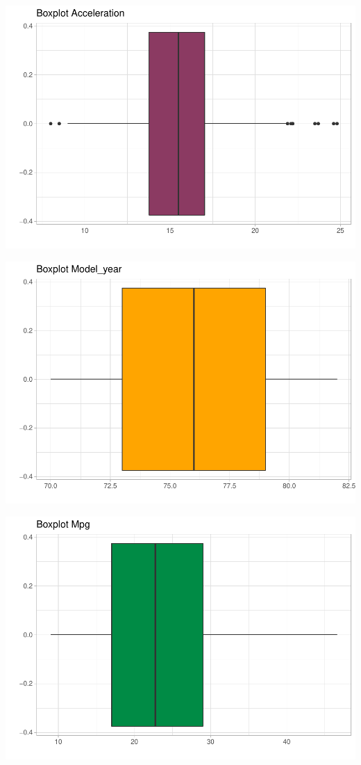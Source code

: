 \begin{center}\includegraphics{img/EDA_files/figure-latex/unnamed-chunk-8-4} \end{center}
\begin{center}\includegraphics{img/EDA_files/figure-latex/unnamed-chunk-8-5} \end{center}
\begin{center}\includegraphics{img/EDA_files/figure-latex/unnamed-chunk-8-6} \end{center}

